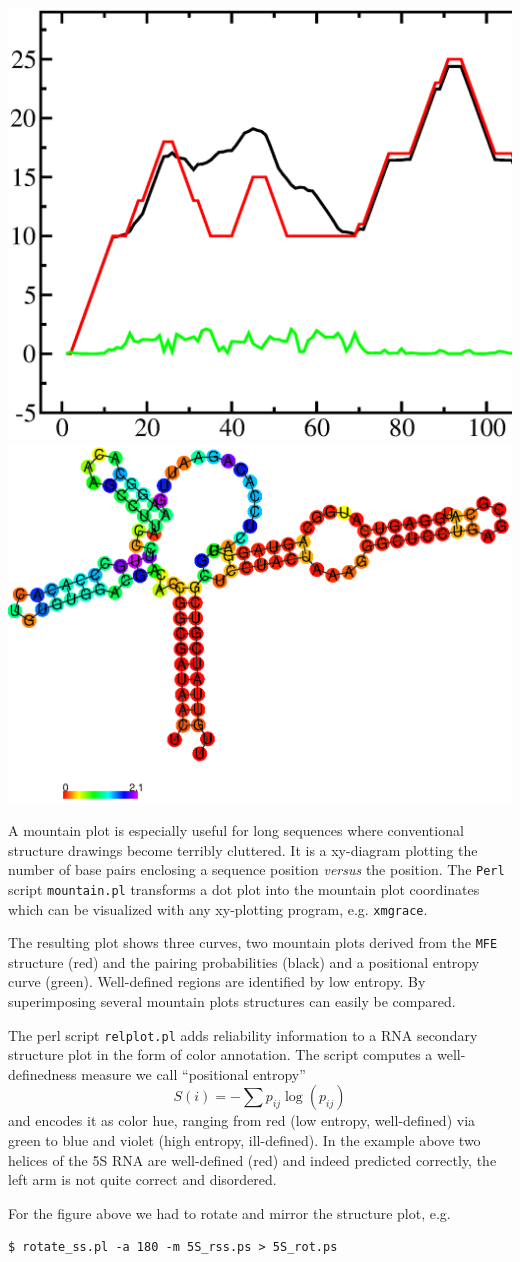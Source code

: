 \documentclass[a4paper]{article}
\begin{document}
  \includegraphics[width=.45\textwidth]{Figures/5S_mt.eps}\hfill  
  \includegraphics[trim=0cm 1.5cm 0cm 0cm, width=.50\textwidth]{Figures/5S_rot.eps}

A mountain plot is especially useful for long sequences where conventional
structure drawings become terribly cluttered.  It is a xy-diagram plotting
the number of base pairs enclosing a sequence position \textit{versus} the
position. The  \texttt{Perl} script \texttt{mountain.pl} transforms a dot
plot into the mountain plot coordinates which can be visualized with any
xy-plotting program, e.g. \texttt{xmgrace}.

The resulting plot shows three curves, two mountain plots derived from
the \texttt{MFE} structure (red) and the pairing probabilities (black) and
a positional entropy curve (green). Well-defined regions are identified by low
entropy. By superimposing several mountain plots structures can easily
be compared.

The perl script \texttt{relplot.pl} adds reliability
information to a RNA secondary structure plot in the form of color
annotation. The script computes a well-definedness measure we call
``positional entropy''
$$S(i) = -\sum p_{ij}\log(p_{ij})$$
and encodes it as color hue, ranging from red
(low entropy, well-defined) via green to blue and violet (high
entropy, ill-defined). In the example above two helices of the 5S RNA are
well-defined (red) and indeed predicted correctly, the left arm is not quite
correct and disordered.

For the figure above we had to rotate and mirror the structure plot, e.g.
\begin{verbatim}
$ rotate_ss.pl -a 180 -m 5S_rss.ps > 5S_rot.ps
\end{verbatim}%
\end{document}
